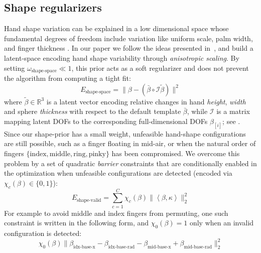 \subsection{Shape regularizers}
\label{sec:shapeprior}
Hand shape variation can be explained in a low dimensional space whose fundamental degrees of freedom include variation like uniform scale, palm width, and finger thickness \cite{khamis15learning}. In our paper we follow the ideas presented in~\cite{edoardo}, and build a latent-space encoding hand shape variability through \emph{anisotropic scaling}. By setting $\omega_\text{shape-space}{\ll}1$,
this prior acts as a soft regularizer and does not prevent the algorithm from computing a tight fit:
% 
\begin{equation}
E_\text{shape-space} = \|\beta - (\bar{\beta} \circ \mathcal{I}\tilde{\beta}) \|^2
\label{eq:shapespace}
\end{equation}
% 
where $\tilde\beta \in \mathbb{R}^3$ is a latent vector encoding relative changes in hand \emph{height}, \emph{width} and sphere \emph{thickness} with respect to the default template $\bar\beta$, while $\mathcal{I}$ is a matrix mapping latent DOFs to the corresponding full-dimensional DOFs $\beta_{[i]}$; see . 
% 
Since our shape-prior has a small weight, unfeasible hand-shape configurations are still possible, such as a finger floating in mid-air, or when the natural order of fingers $\{\text{index},\text{middle},\text{ring},\text{pinky}\}$ has been compromised. 
We overcome this problem by a set of quadratic \emph{barrier} constraints that are conditionally enabled in the optimization when unfeasible configurations are detected (encoded via $\chi_c(\beta) \in \{ 0,1 \}$):
% 
\begin{equation}
E_\text{shape-valid} = \sum_{c=1}^C \chi_c(\beta) \| \left< \beta, \kappa \right> \|_2^2
\label{eq:valideshape}
\end{equation}
% 
For example to avoid middle and index fingers from permuting, one such constraint is written in the following form, and $\chi_0(\beta)=1$ only when an invalid configuration is detected:
% 
\begin{equation*}
\chi_0(\beta) \| \beta_\text{idx-base-x} - \beta_\text{idx-base-rad} - \beta_\text{mid-base-x} + \beta_\text{mid-base-rad} \|_2^2
\end{equation*}
